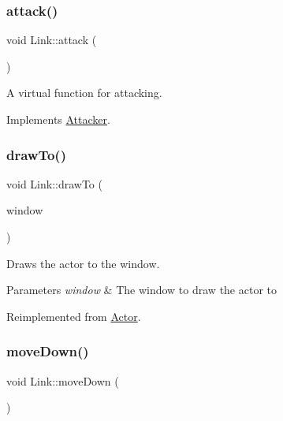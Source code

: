 \subsubsection{\texorpdfstring{attack()}{attack()}}
{\footnotesize\ttfamily void Link\+::attack (\begin{DoxyParamCaption}{ }\end{DoxyParamCaption})\hspace{0.3cm}{\ttfamily [virtual]}}



A virtual function for attacking. 



Implements \mbox{\hyperlink{structAttacker_a4ce0aa08a102bd688d9a47322a830173}{Attacker}}.

\mbox{\label{classLink_ac91a924fdf779fa02d477b7f60dbdc1e}} 
\subsubsection{\texorpdfstring{drawTo()}{drawTo()}}
{\footnotesize\ttfamily void Link\+::draw\+To (\begin{DoxyParamCaption}\item[{sf\+::\+Render\+Window \&}]{window }\end{DoxyParamCaption})\hspace{0.3cm}{\ttfamily [virtual]}}



Draws the actor to the window. 


\begin{DoxyParams}{Parameters}
{\em window} & The window to draw the actor to \\
\hline
\end{DoxyParams}


Reimplemented from \mbox{\hyperlink{classActor_af73a6f6670f0507c9e55ec2f61293535}{Actor}}.

\mbox{\label{classLink_a9ff8ec271a0119f6e1ee178afb47f323}} 
\subsubsection{\texorpdfstring{moveDown()}{moveDown()}}
{\footnotesize\ttfamily void Link\+::move\+Down (\begin{DoxyParamCaption}{ }\end{DoxyParamCaption})\hspace{0.3cm}{\ttfamily [virtual]}}



